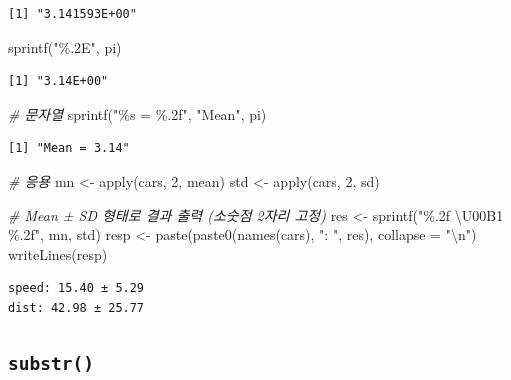 \documentclass[
  11pt,
]{krantz}
\newenvironment{Shaded}{\begin{snugshade}}{\end{snugshade}}
\newcommand{\AttributeTok}[1]{\textcolor[rgb]{0.61,0.61,0.61}{#1}}
\newcommand{\CommentTok}[1]{\textcolor[rgb]{0.37,0.37,0.37}{\textit{#1}}}
\newcommand{\DecValTok}[1]{\textcolor[rgb]{0.06,0.06,0.06}{#1}}
\newcommand{\FunctionTok}[1]{\textcolor[rgb]{0,0,0}{#1}}
\newcommand{\NormalTok}[1]{#1}
\newcommand{\OtherTok}[1]{\textcolor[rgb]{0.37,0.37,0.37}{#1}}
\newcommand{\SpecialCharTok}[1]{\textcolor[rgb]{0,0,0}{#1}}
\newcommand{\StringTok}[1]{\textcolor[rgb]{0.5,0.5,0.5}{#1}}
\begin{document}
\begin{verbatim}
[1] "3.141593E+00"
\end{verbatim}

\begin{Shaded}
\begin{Highlighting}[]
\FunctionTok{sprintf}\NormalTok{(}\StringTok{"\%.2E"}\NormalTok{, pi)}
\end{Highlighting}
\end{Shaded}

\begin{verbatim}
[1] "3.14E+00"
\end{verbatim}

\begin{Shaded}
\begin{Highlighting}[]
\CommentTok{\# 문자열 }
\FunctionTok{sprintf}\NormalTok{(}\StringTok{"\%s = \%.2f"}\NormalTok{, }\StringTok{"Mean"}\NormalTok{, pi)}
\end{Highlighting}
\end{Shaded}

\begin{verbatim}
[1] "Mean = 3.14"
\end{verbatim}

\begin{Shaded}
\begin{Highlighting}[]
\CommentTok{\# 응용 }
\NormalTok{mn }\OtherTok{\textless{}{-}} \FunctionTok{apply}\NormalTok{(cars, }\DecValTok{2}\NormalTok{, mean)}
\NormalTok{std }\OtherTok{\textless{}{-}} \FunctionTok{apply}\NormalTok{(cars, }\DecValTok{2}\NormalTok{, sd)}

\CommentTok{\# Mean ± SD 형태로 결과 출력 (소숫점 2자리 고정)}
\NormalTok{res }\OtherTok{\textless{}{-}} \FunctionTok{sprintf}\NormalTok{(}\StringTok{"\%.2f \textbackslash{}U00B1 \%.2f"}\NormalTok{, mn, std)}
\NormalTok{resp }\OtherTok{\textless{}{-}} \FunctionTok{paste}\NormalTok{(}\FunctionTok{paste0}\NormalTok{(}\FunctionTok{names}\NormalTok{(cars), }\StringTok{": "}\NormalTok{, res), }\AttributeTok{collapse =} \StringTok{"}\SpecialCharTok{\textbackslash{}n}\StringTok{"}\NormalTok{)}
\FunctionTok{writeLines}\NormalTok{(resp)}
\end{Highlighting}
\end{Shaded}

\begin{verbatim}
speed: 15.40 ± 5.29
dist: 42.98 ± 25.77
\end{verbatim}

\normalsize

\hypertarget{substr}{%
\subsection{\texorpdfstring{\textbf{\texttt{substr()}}}{substr()}}\label{substr}}
\end{document}
